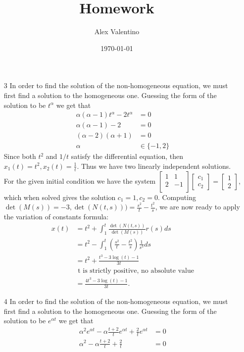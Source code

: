 \documentclass[12pt, letterpaper]{article}
\date{\today}
\author{Alex Valentino}
\title{Homework }
\begin{document}
\begin{enumerate}
	\item[3] In order to find the solution of the non-homogeneous equation, we must first find a solution to the homogeneous one.  Guessing the form of the solution to be $t^\alpha$ we get that
	\begin{align*}
		\alpha(\alpha - 1) t^\alpha - 2 t^\alpha &= 0\\
		\alpha(\alpha - 1) - 2 &= 0\\
		(\alpha -2)(\alpha +1) &= 0\\
		\alpha &\in \{-1,2\}
	\end{align*}
	Since both $t^2$ and $1/t$ satisfy the differential equation, then $x_1(t) = t^2, x_2 (t) = \frac{1}{t}$.  Thus we have two linearly independent solutions. For the given initial condition we have the system $\begin{bmatrix} 1 & 1 \\ 2 & -1\\ \end{bmatrix} \begin{bmatrix} c_1 \\ c_2 \end{bmatrix} = \begin{bmatrix} 1 \\ 2 \end{bmatrix}$, which when solved gives the solution $c_1 =1, c_2 = 0$.  Computing $\det (M(s)) = -3, \det (N(t,s))) = \frac{s^2}{t} - \frac{t^2}{s}$, we are now ready to apply the variation of constants formula:
	\begin{align*}
		x(t) &= t^2 +  \int_1^t \frac{\det(N(t,s))}{\det(M(s))} r(s) ds\\
		&= t^2 -\int_1^t (\frac{s^2}{t} - \frac{t^2}{s}) \frac{1}{s^3}ds\\
		&= t^2 + \frac{t^3 -3 \log(t) -1}{3t}\\ &\text{ t is strictly positive, no absolute value}\\
		&= \frac{4t^3 - 3\log(t) -1}{3t}.
	\end{align*}
	\item[4] 
	In order to find the solution of the non-homogeneous equation, we must first find a solution to the homogeneous one.  Guessing the form of the solution to be $e^{\alpha t}$ we get that 
	\begin{align*}
		\alpha^2 e^{\alpha t} - \alpha \frac{t+2}{t}e^{\alpha t} +\frac{2}{t} e^{\alpha t} &= 0\\
		\alpha^2 - \alpha \frac{t+2}{t}+\frac{2}{t} &= 0\\

\end{align*}
\end{enumerate}
\end{document}
